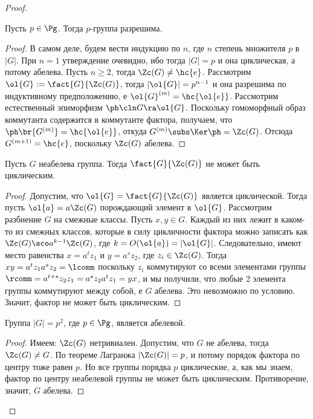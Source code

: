 \documentclass[a4paper]{article}
\newcommand{\kph}{\Ker \ph}
\begin{document}
\begin{proof}
\begin{theorem}
Пусть $p \in \Pg$. Тогда $p$-группа разрешима.
\end{theorem}
\begin{proof}
В самом деле, будем вести индукцию по $n$, где $n$ степень множителя  $p$ в $|G|$. При $n=1$ утверждение
очевидно, ибо тогда $|G|=p$ и она циклическая, а потому абелева. Пусть $n \ge 2$, тогда $\Zc(G) \neq \hc{e}$.
Рассмотрим $\ol{G} := \fact{G}{\Zc(G)}$, тогда $|\ol{G}|=p^{n-1}$ и она разрешима по индуктивному
предположению, е $\ol{G}^{(m)}=\hc{\ol{e}}$. Рассмотрим естественный эпиморфизм $\ph\cln G \ra \ol{G}$.
Поскольку гомоморфный образ коммутанта содержится в коммутанте фактора, получаем, что $\ph\br{G^{(m)}} =
\hc{\ol{e}}$, откуда $G^{(m)} \subs \kph = \Zc(G)$. Отсюда $G^{(m+1)} = \hc{e}$, поскольку $\Zc(G)$
абелева.
\end{proof}

\begin{theorem}
Пусть $G$ неабелева группа. Тогда $\fact{G}{\Zc(G)}$ не может быть циклическим.
\end{theorem}
\begin{proof}
Допустим, что $\ol{G} =\fact{G}{\Zc(G)}$ является циклической. Тогда пусть  $\ol{a}=a\Zc(G)$ порождающий
элемент в $\ol{G}$. Рассмотрим разбиение $G$ на смежные классы. Пусть $x, y \in G$. Каждый из них лежит в
каком-то из смежных классов, которые в силу цикличности фактора можно записать как $\Zc(G)\sco
a^{k-1}\Zc(G)$, где $k = O(\ol{a})=|\ol{G}|$. Следовательно, имеют место равенства $x=a^tz_1$ и $y=a^sz_2$,
где $z_i \in \Zc(G)$. Тогда $xy=a^tz_1 a^sz_2=\lcomm$ поскольку $z_i$ коммутируют со всеми элементами группы
$\rcomm = a^{t+s} z_2 z_1 = a^s z_2 a^t z_1 = yx$, и мы получили, что любые 2 элемента группы коммутируют
между собой, е $G$ абелева. Это невозможно по условию. Значит, фактор не может быть циклическим.
\end{proof}

\begin{imp}
Группа $|G| = p^2$, где $p \in \Pg$, является абелевой.
\end{imp}
\begin{proof}
Имеем: $\Zc(G)$ нетривиален. Допустим, что $G$ не абелева,  тогда $\Zc(G) \neq G$. По теореме Лагранжа
$|\Zc(G)|=p$, и потому порядок фактора по центру тоже равен $p$. Но все группы порядка $p$ циклические, а,
как мы знаем, фактор по центру неабелевой группы не может быть циклическим. Противоречие, значит, $G$
абелева.
\end{proof}


\end{proof}
\end{document}
